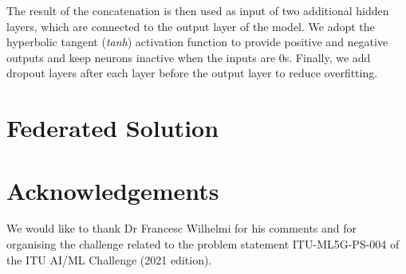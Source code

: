 \documentclass[10pt,conference ]{IEEEtran}
\begin{document}
The result of the concatenation is then used as input of two additional hidden layers, which are connected to the output layer of the model. 
We adopt the hyperbolic tangent (\emph{tanh}) activation function to provide positive and negative outputs and keep neurons inactive when the inputs are $0$s. Finally, we add dropout layers after each layer before the output layer to reduce overfitting. 


\section{Federated Solution}\label{Sec: Federated Solution}



\section{Acknowledgements}\label{Sec: Lesson Learned}
We would like to thank Dr Francesc Wilhelmi for his comments and for organising the challenge related to the problem statement ITU-ML5G-PS-004 of the ITU AI/ML Challenge (2021 edition). 




\end{document}
